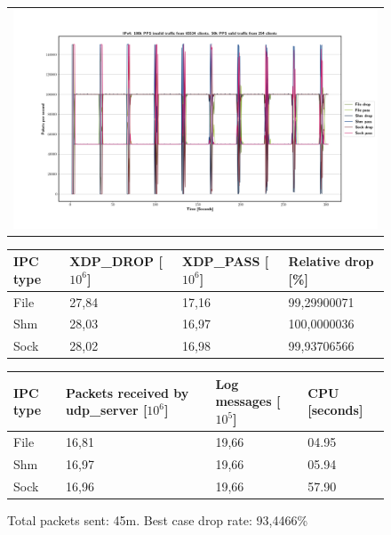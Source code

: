 \begin{figure}[!h]
	\centering
	\scriptsize
	\begin{tabular}{c}
    	\centerline{\includegraphics[width=1.2\textwidth]{images/IPv4_100k_65534_1.png}}
	\end{tabular}
	\begin{tabular}{llll}
		\toprule
		\textbf{IPC type} & \textbf{XDP\_DROP [$10^6$]} & \textbf{XDP\_PASS [$10^6$]} & \textbf{Relative drop [\%]} \\ \midrule 
		File & 27,84 & 17,16 & 99,29900071 \\
        Shm & 28,03 & 16,97 & 100,0000036 \\
        Sock & 28,02 & 16,98 & 99,93706566 \\
	\bottomrule
	\end{tabular}
    \begin{tabular}{llll}
		\toprule
		\textbf{IPC type} & \textbf{Packets received by udp\_server [$10^6$]} & \textbf{Log messages [$10^5$]} & \textbf{CPU [seconds]} \\ \midrule 
		File & 16,81 & 19,66 & 04.95 \\
        Shm & 16,97 & 19,66 & 05.94 \\
        Sock & 16,96 & 19,66 & 57.90 \\
	\bottomrule
	\end{tabular}
	\caption[Simplefail2ban, IPv4, 100k \ac{PPS}, 65534 malicious clients]{Total packets sent: 45m. Best case drop rate: 93,4466\%}
	\label{fig:data:ipv4:100k:65534}
\end{figure}

